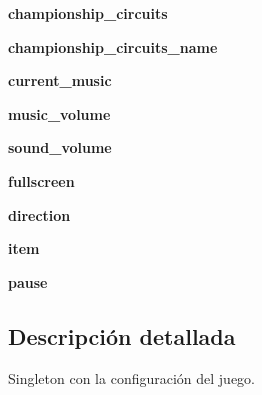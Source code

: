 \begin{DoxyCompactItemize}
\item 
\hypertarget{classengine_1_1config_1_1Config_a25231eede3052bbbca656431f068c6a9}{
{\bfseries championship\-\_\-circuits}}
\label{classengine_1_1config_1_1Config_a25231eede3052bbbca656431f068c6a9}

\item 
\hypertarget{classengine_1_1config_1_1Config_a0f9aab51e67dc0b8d7efe091e9346364}{
{\bfseries championship\-\_\-circuits\-\_\-name}}
\label{classengine_1_1config_1_1Config_a0f9aab51e67dc0b8d7efe091e9346364}

\item 
\hypertarget{classengine_1_1config_1_1Config_a7e6cdc1ff026ab7a3bc6af15249b6412}{
{\bfseries current\-\_\-music}}
\label{classengine_1_1config_1_1Config_a7e6cdc1ff026ab7a3bc6af15249b6412}

\item 
\hypertarget{classengine_1_1config_1_1Config_ad29194ce5d9deb458e48f746bb6ffd73}{
{\bfseries music\-\_\-volume}}
\label{classengine_1_1config_1_1Config_ad29194ce5d9deb458e48f746bb6ffd73}

\item 
\hypertarget{classengine_1_1config_1_1Config_aac5a1db4f34ba534a84263ed469304df}{
{\bfseries sound\-\_\-volume}}
\label{classengine_1_1config_1_1Config_aac5a1db4f34ba534a84263ed469304df}

\item 
\hypertarget{classengine_1_1config_1_1Config_a25be4de5e413067f4e3626bbf01daaac}{
{\bfseries fullscreen}}
\label{classengine_1_1config_1_1Config_a25be4de5e413067f4e3626bbf01daaac}

\item 
\hypertarget{classengine_1_1config_1_1Config_a2d95f9e925fcfc8ce1be750710cc04aa}{
{\bfseries direction}}
\label{classengine_1_1config_1_1Config_a2d95f9e925fcfc8ce1be750710cc04aa}

\item 
\hypertarget{classengine_1_1config_1_1Config_aad4d9684a85e157cd588bb788fc54ae5}{
{\bfseries item}}
\label{classengine_1_1config_1_1Config_aad4d9684a85e157cd588bb788fc54ae5}

\item 
\hypertarget{classengine_1_1config_1_1Config_a0a2235b29c17cac138314a4bbd278f58}{
{\bfseries pause}}
\label{classengine_1_1config_1_1Config_a0a2235b29c17cac138314a4bbd278f58}

\end{DoxyCompactItemize}


\subsection{\-Descripción detallada}
\-Singleton con la configuración del juego. 

